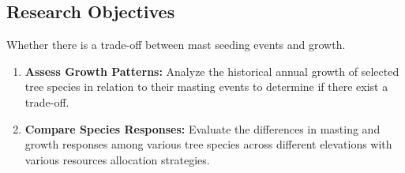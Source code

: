 \documentclass[11pt,letter]{article}
\begin{document}
\subsection{Research Objectives}
Whether there is a trade-off between mast seeding events and growth.
	\begin{enumerate}
	\item \textbf{Assess Growth Patterns:} Analyze the historical annual growth of selected tree species in relation to their masting events to determine if there exist a trade-off.
	\item \textbf{Compare Species Responses:} Evaluate the differences in masting and growth responses among various tree species across different elevations with various resources allocation strategies.
	\end{enumerate}
\end{document}
